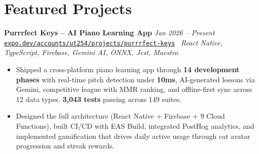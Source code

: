 \documentclass[10pt,a4paper]{article}
\newcommand{\projectentryurl}[5]{%
  \Needspace{3\baselineskip}%
  \textbf{#1} \hfill \textit{#2}\\[-0.15em]
  {\small\href{#3}{\texttt{#4}}} \textbar\ \textit{#5}\\[-0.25em]
}
\begin{document}
\clearpage
\section*{Featured Projects}
\projectentryurl{Purrrfect Keys -- AI Piano Learning App}{Jan 2026 -- Present}{https://expo.dev/accounts/ut254/projects/purrrfect-keys/builds/229bd252-c684-4af5-b39f-4f3623455a7e}{expo.dev/accounts/ut254/projects/purrrfect-keys}{React Native, TypeScript, Firebase, Gemini AI, ONNX, Jest, Maestro}
\begin{itemize}
  \item Shipped a cross-platform piano learning app through \textbf{14 development phases} with real-time pitch detection under \textbf{10ms}, AI-generated lessons via Gemini, competitive league with MMR ranking, and offline-first sync across 12 data types. \textbf{3,043 tests} passing across 149 suites.
  \item Designed the full architecture (React Native + Firebase + 9 Cloud Functions), built CI/CD with EAS Build, integrated PostHog analytics, and implemented gamification that drives daily active usage through cat avatar progression and streak rewards.
\end{itemize}
\vspace{0.20em}
\clearpage
\null
\clearpage
\end{document}
